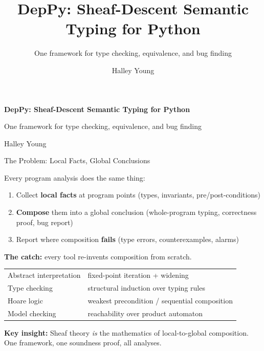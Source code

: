 \documentclass[aspectratio=169,10pt]{beamer}
\title{\textbf{DepPy}: Sheaf-Descent Semantic Typing for Python}
\subtitle{One framework for type checking, equivalence, and bug finding}
\author{Halley Young}
\date{}
\newcommand{\keyinsight}[1]{%
  \vspace{2pt}
  \begin{center}
  \colorbox{sheafbox}{\parbox{0.88\textwidth}{\centering\small\textbf{\textcolor{keyblue}{Key insight:}} #1}}
  \end{center}
  \vspace{-4pt}
}
\begin{document}
\begin{frame}[plain]
\vfill
{\Large\bfseries DepPy: Sheaf-Descent Semantic Typing for Python}

\vspace{0.5em}
{\normalsize One framework for type checking, equivalence, and bug finding}

\vspace{1em}
{\normalsize Halley Young}
\vfill
\end{frame}

\begin{frame}{The Problem: Local Facts, Global Conclusions}

Every program analysis does the same thing:

\begin{enumerate}
  \item Collect \textbf{local facts} at program points
        {\small (types, invariants, pre/post-conditions)}
  \item \textbf{Compose} them into a global conclusion
        {\small (whole-program typing, correctness proof, bug report)}
  \item Report where composition \textbf{fails}
        {\small (type errors, counterexamples, alarms)}
\end{enumerate}

\vspace{0.3em}
\textbf{The catch:} every tool re-invents composition from scratch.

{\small
\begin{tabular}{@{}ll@{}}
Abstract interpretation & fixed-point iteration + widening \\
Type checking & structural induction over typing rules \\
Hoare logic & weakest precondition / sequential composition \\
Model checking & reachability over product automaton \\
\end{tabular}
}

\keyinsight{Sheaf theory \emph{is} the mathematics of local-to-global composition.
One framework, one soundness proof, all analyses.}

\end{frame}
\end{document}
